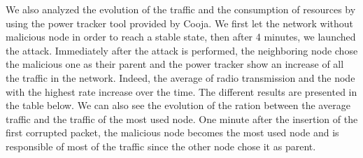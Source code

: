 \documentclass{report}
\begin{document}
We also analyzed the evolution of the traffic and the consumption of resources by using the power tracker tool provided by Cooja. We first let the network without malicious node in order to reach a stable state, then after 4 minutes, we launched the attack. Immediately after the attack is performed, the neighboring node chose the malicious one as their parent and the power tracker show an increase of all the traffic in the network. Indeed, the average of radio transmission and the node with the highest rate increase over the time. The different results are presented in the table below. We can also see the evolution of the ration between the average traffic and the traffic of the most used node. One minute after the insertion of the first corrupted packet, the malicious node becomes the most used node and is responsible of most of the traffic since the other node chose it as parent. 


\end{document}

